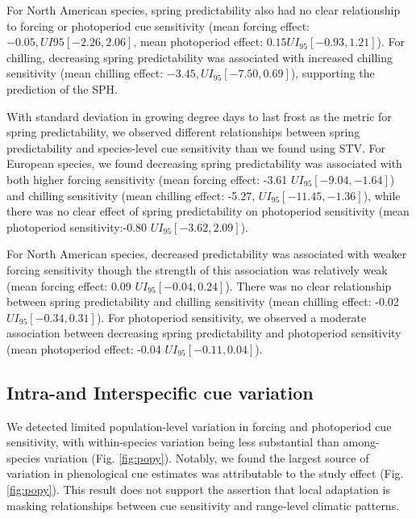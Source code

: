 \documentclass[12pt]{article}
\begin{document}
For North American species, spring predictability also had no clear relationship to forcing or photoperiod cue sensitivity (mean forcing effect: $-0.05, UI{95}[-2.26, 2.06]$, mean photoperiod effect: $0.15 UI_{95}[-0.93, 1.21]$). For chilling, decreasing spring predictability was associated with increased chilling sensitivity (mean chilling effect: $-3.45, UI_{95}[-7.50, 0.69]$), %
supporting the prediction of the SPH.

With standard deviation in growing degree days to last frost as the metric for spring predictability, we observed different relationships between spring predictability and species-level cue sensitivity than we found using STV. For European species, we found decreasing spring predictability was associated with both higher forcing sensitivity (mean forcing effect: -3.61 $UI_{95}[-9.04, -1.64]$) and chilling sensitivity (mean chilling effect: -5.27, $UI_{95}[-11.45, -1.36]$), while there was no clear effect of spring predictability on photoperiod sensitivity (mean photoperiod sensitivity:-0.80 $UI_{95}[-3.62, 2.09]$). 

For North American species, decreased predictability was associated with weaker forcing sensitivity though the strength of this association was relatively weak (mean forcing effect: 0.09 $UI_{95}[-0.04,0.24]$). There was no clear relationship between spring predictability and chilling sensitivity (mean chilling effect: -0.02 $UI_{95}[-0.34, 0.31]$). For photoperiod sensitivity, we observed a moderate association between decreasing spring predictability and photoperiod sensitivity (mean photoperiod effect: -0.04 $UI_{95}[-0.11, 0.04]$). %

\subsection*{Intra-and Interspecific cue variation}
We detected limited population-level variation in forcing and photoperiod cue sensitivity, with within-species variation being less substantial than among-species variation (Fig. \ref{fig:popy}). Notably, we found the largest source of variation in phenological cue estimates was attributable to the study effect (Fig. \ref{fig:popy}). This result does not support the assertion that local adaptation is masking relationships between cue sensitivity and range-level climatic patterns.
\end{document}

